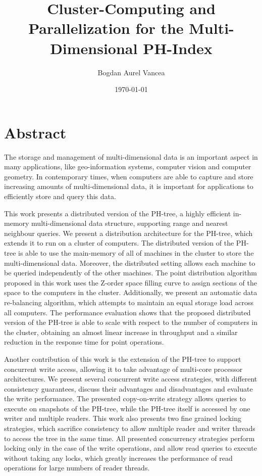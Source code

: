 \documentclass[11pt,a4paper]{globis-book}
\title{Cluster-Computing and Parallelization for the
    Multi-Dimensional PH-Index}
\author{Bogdan Aurel Vancea}
\institute{Institute of Information Systems}
\date{\today}
\begin{document}
\frontmatter
\maketitlepage
\cleardoublepage
{}

\chapter*{Abstract}

The storage and management of multi-dimensional data is an important aspect in many applications, like geo-information systems, computer vision and computer geometry. In contemporary times, when computers are able to capture and store increasing amounts of multi-dimensional data, it is important for applications to efficiently store and query this data. 

This work presents a distributed version of the PH-tree, a highly efficient in-memory multi-dimensional data structure, supporting range and nearest neighbour queries. We present a distribution architecture for the PH-tree, which extends it to run on a cluster of computers. The distributed version of the PH-tree is able to use the main-memory of all of machines in the cluster to store the multi-dimensional data. Moreover, the distributed setting allows each machine to be queried independently of the other machines. The point distribution algorithm proposed in this work uses the Z-order space filling curve to assign sections of the space to the computers in the cluster. Additionally, we present an automatic data re-balancing algorithm, which attempts to maintain an equal storage load across all computers. The performance evaluation shows that the proposed distributed version of the PH-tree is able to scale with respect to the number of computers in the cluster, obtaining an almost linear increase in throughput and a similar reduction in the response time for point operations. 

Another contribution of this work is the extension of the PH-tree to support concurrent write access, allowing it to take advantage of multi-core processor architectures. We present several concurrent write access strategies, with different consistency guarantees, discuss their advantages and disadvantages and evaluate the write performance. The presented copy-on-write strategy allows queries to execute on snapshots of the PH-tree, while the PH-tree itself is accessed by one writer and multiple readers. This work also presents two fine grained locking strategies, which sacrifice consistency to allow multiple reader and writer threads to access the tree in the same time. All presented concurrency strategies perform locking only in the case of the write operations, and allow read queries to execute without taking any locks, which greatly increases the performance of read operations for large numbers of reader threads.  
\end{document}
